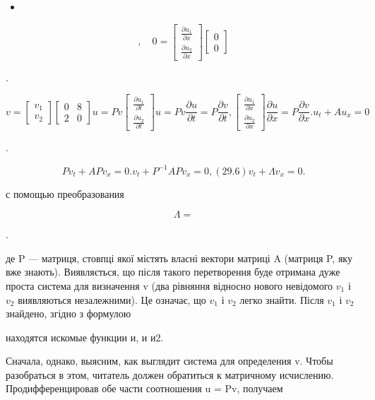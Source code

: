 \documentclass[
  ukrainian,
]{article}
\providecommand{\tightlist}{%
  \setlength{\itemsep}{0pt}\setlength{\parskip}{0pt}}
\begin{document}
\begin{itemize}
\tightlist
\item
\end{itemize}

\[
, \quad 0 =
\begin{bmatrix} \frac{\partial u_1}{\partial x} \\ \frac{\partial u_2}{\partial x} \end{bmatrix}
\begin{bmatrix} 0 \\ 0 \end{bmatrix}
\]

.

\[
v =
\begin{bmatrix} v_1 \\ v_2 \end{bmatrix}
\begin{bmatrix} 0 & 8 \\ 2 & 0 \end{bmatrix}
u = Pv
\begin{bmatrix} \frac{\partial u_1}{\partial t} \\ \frac{\partial u_2}{\partial t} \end{bmatrix}
u = Pv
\frac{\partial u}{\partial t} = P \frac{\partial v}{\partial t},
\begin{bmatrix} \frac{\partial u_1}{\partial x} \\ \frac{\partial u_2}{\partial x} \end{bmatrix}
\frac{\partial u}{\partial x} = P \frac{\partial v}{\partial x}.
u_t + Au_x = 0
\]

.

\[
Pv_t + APv_x = 0.
v_t + P^{-1}APv_x = 0,
(29.6) v_t + \Lambda v_x = 0.
\]

с помощью преобразования

\[
\Lambda =
\]

.

де P --- матриця, стовпці якої містять власні вектори матриці A (матриця
P, яку вже знають). Виявляється, що після такого перетворення буде
отримана дуже проста система для визначення v (два рівняння відносно
нового невідомого \(v_1\) і \(v_2\) виявляються незалежними). Це
означає, що \(v_1\) і \(v_2\) легко знайти. Після \(v_1\) і \(v_2\)
знайдено, згідно з формулою

находятся искомые функции и, и и2.

Сначала, однако, выясним, как выглядит система для определения v. Чтобы
разобраться в этом, читатель должен обратиться к матричному исчислению.
Продифференцировав обе части соотношения u = Pv, получаем
\end{document}
